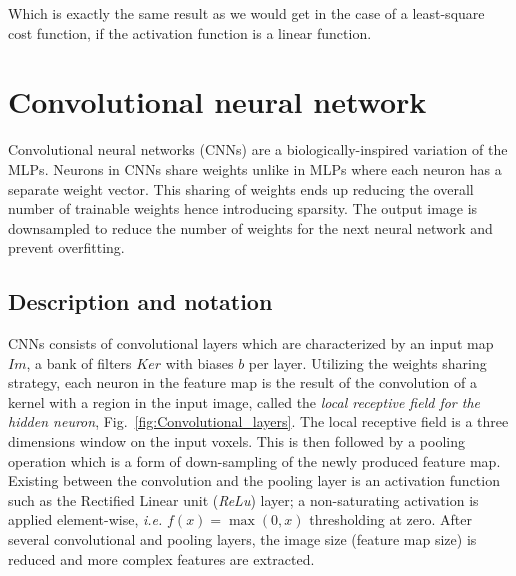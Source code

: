 \documentclass[final, paper=letter,5p,times,twocolumn]{elsarticle}
\begin{document}
Which is exactly the same result as we would get in the case of a least-square cost function, if the activation function is a linear function. 


\section{Convolutional neural network}

Convolutional neural networks (CNNs) are a biologically-inspired variation of the MLPs. Neurons in CNNs share weights unlike in MLPs where each neuron has a separate weight vector. This sharing of weights ends up reducing the overall number of trainable weights hence introducing sparsity. The output image is downsampled to reduce the number of weights for the next neural network and prevent overfitting.

\subsection{Description and notation}

CNNs consists of convolutional layers which are characterized by an input map $Im$, a bank of filters $Ker$ with biases $b$ per layer. Utilizing the weights sharing strategy, each neuron in the feature map is the result of the convolution of a kernel with a region in the input image, called the {\it local receptive field for the hidden neuron}, Fig.~\ref{fig:Convolutional_layers}. The local receptive field is a three dimensions window on the input voxels. This is then followed by a pooling operation which is a form of down-sampling of the newly produced feature map. Existing between the convolution and the pooling layer is an activation function such as the Rectified Linear unit ({\it ReLu}) layer; a non-saturating activation is applied element-wise, {\it i.e.} $f(x) = \max(0,x)$ thresholding at zero. After several convolutional and pooling layers, the image size (feature map size) is reduced and more complex features are extracted. \\
\end{document}
